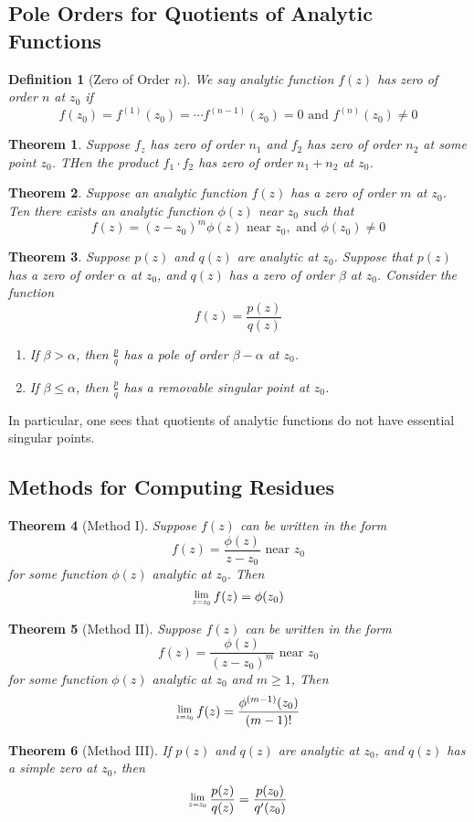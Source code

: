 \documentclass[12pt]{article}
\newcommand{\Res}[1]{\raisebox{0.5ex}{\scalebox{0.8}{$\displaystyle \lim_{#1}\;$}}}
\newtheorem{definition}{Definition}[section]
\newtheorem{theorem}{Theorem}[section]
\theoremstyle{definition}
\begin{document}
\subsection{Pole Orders for Quotients of Analytic Functions}
\begin{definition}[Zero of Order {$n$}]
\normalfont We say analytic function $f(z)$ has zero of order $n$ at $z_0$ if
\[
f(z_0) = f^{(1)}(z_0) = \cdots f^{(n-1)}(z_0) = 0 \text{ and } f^{(n)}(z_0) \neq 0
\]
\end{definition}
\begin{theorem}\normalfont Suppose $f_z$ has zero of order $n_1$ and $f_2$ has zero of order $n_2$ at some point $z_0$. THen the product $f_1\cdot f_2$ has zero of order $n_1 + n_2$ at $z_0$.
\end{theorem}
\begin{theorem}\normalfont Suppose an analytic function $f(z)$ has a zero of order $m$ at $z_0$. Ten there exists an analytic function $\phi(z)$ near $z_0$ such that
\[
f(z) =  (z-z_0)^m \phi(z) \text{ near }z_0, \text{ and }\phi(z_0)\neq 0
\]
\end{theorem}
\begin{theorem}\normalfont Suppose $p(z)$ and $q(z)$ are analytic at $z_0$. Suppose that $p(z)$ has a zero of order $\alpha$ at $z_0$, and $q(z)$ has a zero of order $\beta$ at $z_0$. Consider the function
\[
f(z) = \frac{p(z)}{q(z)}
\]
\begin{enumerate}
	\item If $\beta>\alpha$, then $\frac{p}{q}$ has a pole of order $\beta-\alpha$ at $z_0$.
	\item If $\beta \leq \alpha$, then $\frac{p}{q}$ has a removable singular point at $z_0$.
\end{enumerate}
\end{theorem}
In particular, one sees that quotients of analytic functions do not have essential singular points.
\subsection{Methods for Computing Residues}
\begin{theorem}[Method I]
\normalfont Suppose $f(z)$ can be written in the form
\[
f(z)=\frac{\phi(z)}{z-z_0}\text{ near }z_0
\]
for some function $\phi(z)$ analytic at $z_0$. Then
\[
\Res{z=z_0}f(z)=\phi(z_0)
\]
\end{theorem}
\begin{theorem}[Method II]
\normalfont Suppose $f(z)$ can be written in the form
\[
f(z)=\frac{\phi(z)}{(z-z_0)^m}\text{ near }z_0
\]
for some function $\phi(z)$ analytic at $z_0$ and $m\geq 1$, Then
\[
\Res{z=z_0}f(z)=\frac{\phi^{(m-1)}(z_0)}{(m-1)!}
\]
\end{theorem}
\begin{theorem}[Method III]
\normalfont If $p(z)$ and $q(z)$ are analytic at $z_0$, and $q(z)$ has a simple zero at $z_0$, then
\[
\Res{z=z_0}\frac{p(z)}{q(z)} = \frac{p(z_0)}{q'(z_0)}
\]
\end{theorem}
\end{document}
